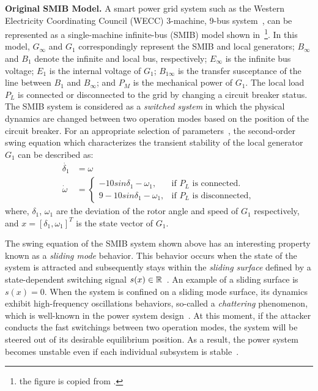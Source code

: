 \vspace{0.5em}
\noindent
{\bf Original SMIB Model.}
A smart power grid system such as the Western Electricity Coordinating
Council (WECC) 3-machine, 9-bus system~\cite{sauer1998power}, can be represented as a single-machine infinite-bus (SMIB) model shown in~\footnote{the figure is copied from \cite{farraj2014practical}.}. In this model, $G_\infty$ and $G_1$ correspondingly represent the SMIB and local generators; $B_\infty$ and $B_1$ denote the infinite and local bus, respectively; $E_\infty$ is the infinite bus voltage; $E_1$ is the internal voltage of $G_1$; $B_{1\infty}$ is the transfer susceptance of the line between $B_1$ and $B_\infty$; and $P_M$ is the mechanical power of $G_1$. The local load $P_L$ is connected or disconnected to the grid by changing a circuit breaker status. 
%
The SMIB system is considered as a \emph{switched system} in which the physical dynamics are changed between two operation modes based on the position of the circuit breaker. 
%
%
For an appropriate selection of parameters~\cite{farraj2014practical}, the second-order swing equation which characterizes the transient stability of the local generator $G_1$ can be described as:
%
\begin{align}
\dot{\delta_1} & = \omega \nonumber \\
\dot{\omega} & = 
\begin{cases}
    -10sin\delta_1 - \omega_1, & \text{if $P_L$ is connected}.\\
    9 - 10sin\delta_1 - \omega_1, & \text{if $P_L$ is disconnected},
 \end{cases} \nonumber
\end{align}
%
where, $\delta_1$, $\omega_1$ are the deviation of the rotor angle and speed of $G_1$ respectively, and $x = [\delta_1,\omega_1]^T$ is the state vector of $G_1$.
%
%

The swing equation of the SMIB system shown above has an interesting property known as a \emph{sliding mode} behavior. This behavior occurs when the state of the system is attracted and subsequently stays within the \emph{sliding surface} defined by a state-dependent switching signal $s(x)\in\mathbb{R}$~\cite{decarlo1988variable, liu2014coordinated}. An example of a sliding surface is $s(x) = 0$. When the system is confined on a sliding mode surface, its dynamics exhibit high-frequency oscillations behaviors, so-called a \emph{chattering} phenomenon, which is well-known in the power system design~\cite{sabanovic2004variable}.
%
At this moment, if the attacker conducts the fast switchings between two  operation modes, the system will be steered out of its desirable equilibrium position. As a result, the power system becomes unstable even if each individual subsystem is stable~\cite{liu2014coordinated}.  
% 

